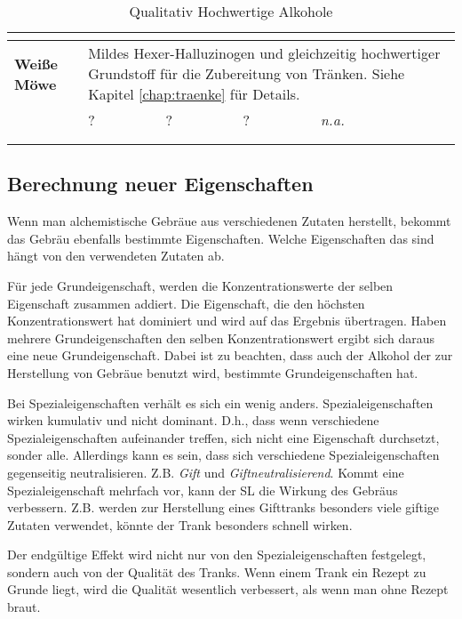 \begin{longtable}{|p{6cm}|p{}|p{}|p{}|p{1cm}|}
\multicolumn{5}{c}{} \\ \hline

\textbf{Weiße Möwe} & \multicolumn{4}{p{10cm}|}{Mildes Hexer-Halluzinogen und gleichzeitig hochwertiger Grundstoff für die Zubereitung von Tränken. Siehe Kapitel \ref{chap:traenke} für Details.} \\ \hline
\multicolumn{1}{r|}{} & ? & ? & ? & \textit{n.a.} \\ \cline{2-5}

\multicolumn{5}{c}{} \\ 

\caption{Qualitativ Hochwertige Alkohole}
\label{tab:qualitativ_hochwertige_alkohole}
\end{longtable}


\subsection{Berechnung neuer Eigenschaften}
\label{chap:berechnung_neuer_eigenschaften}
Wenn man alchemistische Gebräue aus verschiedenen Zutaten herstellt, bekommt das Gebräu ebenfalls bestimmte Eigenschaften. Welche Eigenschaften das sind hängt von den verwendeten Zutaten ab. 

Für jede Grundeigenschaft, werden die Konzentrationswerte der selben Eigenschaft zusammen addiert. Die Eigenschaft, die den höchsten Konzentrationswert hat dominiert und wird auf das Ergebnis übertragen. Haben mehrere Grundeigenschaften den selben Konzentrationswert ergibt sich daraus eine neue Grundeigenschaft. Dabei ist zu beachten, dass auch der Alkohol der zur Herstellung von Gebräue benutzt wird, bestimmte Grundeigenschaften hat. 

Bei Spezialeigenschaften verhält es sich ein wenig anders. Spezialeigenschaften wirken kumulativ und nicht dominant. D.h., dass wenn verschiedene Spezialeigenschaften aufeinander treffen, sich nicht eine Eigenschaft durchsetzt, sonder alle. Allerdings kann es sein, dass sich verschiedene Spezialeigenschaften gegenseitig neutralisieren. Z.B. \textit{Gift} und \textit{Giftneutralisierend}. Kommt eine Spezialeigenschaft mehrfach vor, kann der SL die Wirkung des Gebräus verbessern. Z.B. werden zur Herstellung eines Gifttranks besonders viele giftige Zutaten verwendet, könnte der Trank besonders schnell wirken.

Der endgültige Effekt wird nicht nur von den Spezialeigenschaften festgelegt, sondern auch von der Qualität des Tranks. Wenn einem Trank ein Rezept zu Grunde liegt, wird die Qualität wesentlich verbessert, als wenn man ohne Rezept braut.

